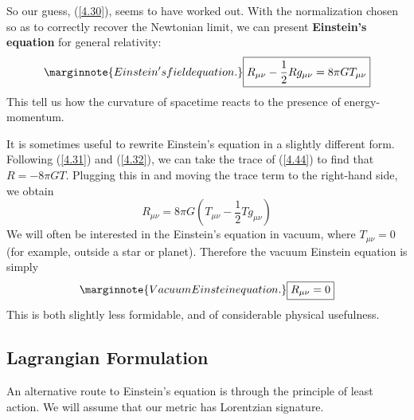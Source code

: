 So our guess, (\ref{4.30}), seems to have worked out. With the normalization chosen so as to correctly recover the Newtonian limit, we can present \textbf{Einstein's equation} for general relativity:
\begin{equation}\label{4.44}\marginnote{Einstein's field equation.}
    \boxed{R_{\mu\nu}-\frac{1}{2}Rg_{\mu\nu}=8\pi GT_{\mu\nu}}
\end{equation}
This tell us how the curvature of spacetime reacts to the presence of energy-momentum.

It is sometimes useful to rewrite Einstein's equation in a slightly different form. Following (\ref{4.31}) and (\ref{4.32}), we can take the trace of (\ref{4.44}) to find that $R=-8\pi GT$. Plugging this in and moving the trace term to the right-hand side, we obtain
\begin{equation}\label{4.45}
    \boxed{R_{\mu\nu}=8\pi G\left(T_{\mu\nu}-\frac{1}{2}Tg_{\mu\nu}\right)}
\end{equation}
We will often be interested in the Einstein's equation in vacuum, where $T_{\mu\nu}=0$ (for example, outside a star or planet). Therefore the vacuum Einstein equation is simply
\begin{equation}\label{4.46}\marginnote{Vacuum Einstein equation.}
    \boxed{R_{\mu\nu}=0}
\end{equation}
This is both slightly less formidable, and of considerable physical usefulness.

\subsection{Lagrangian Formulation}
An alternative route to Einstein's equation is through the principle of least action. We will assume that our metric has Lorentzian signature.

